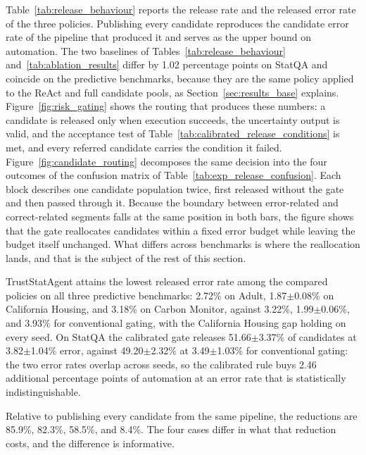 \documentclass[preprint,12pt,authoryear]{elsarticle}
\begin{document}
Table~\ref{tab:release_behaviour} reports the release rate and the released error rate of the three policies.
Publishing every candidate reproduces the candidate error rate of the pipeline that produced it and serves as the upper bound on automation.
The two baselines of Tables~\ref{tab:release_behaviour} and~\ref{tab:ablation_results} differ by 1.02 percentage points on StatQA and coincide on the predictive benchmarks, because they are the same policy applied to the ReAct and full candidate pools, as Section~\ref{sec:results_base} explains.
Figure~\ref{fig:risk_gating} shows the routing that produces these numbers: a candidate is released only when execution succeeds, the uncertainty output is valid, and the acceptance test of Table~\ref{tab:calibrated_release_conditions} is met, and every referred candidate carries the condition it failed.
Figure~\ref{fig:candidate_routing} decomposes the same decision into the four outcomes of the confusion matrix of Table~\ref{tab:exp_release_confusion}.
Each block describes one candidate population twice, first released without the gate and then passed through it.
Because the boundary between error-related and correct-related segments falls at the same position in both bars, the figure shows that the gate reallocates candidates within a fixed error budget while leaving the budget itself unchanged.
What differs across benchmarks is where the reallocation lands, and that is the subject of the rest of this section.

\begin{sloppypar}
TrustStatAgent attains the lowest released error rate among the compared policies on all three predictive benchmarks: 2.72\% on Adult, 1.87$\pm$0.08\% on California Housing, and 3.18\% on Carbon Monitor, against 3.22\%, 1.99$\pm$0.06\%, and 3.93\% for conventional gating, with the California Housing gap holding on every seed.
On StatQA the calibrated gate releases 51.66$\pm$3.37\% of candidates at 3.82$\pm$1.04\% error, against 49.20$\pm$2.32\% at 3.49$\pm$1.03\% for conventional gating: the two error rates overlap across seeds, so the calibrated rule buys 2.46 additional percentage points of automation at an error rate that is statistically indistinguishable.
\end{sloppypar}
Relative to publishing every candidate from the same pipeline, the reductions are 85.9\%, 82.3\%, 58.5\%, and 8.4\%.
The four cases differ in what that reduction costs, and the difference is informative.
\end{document}

